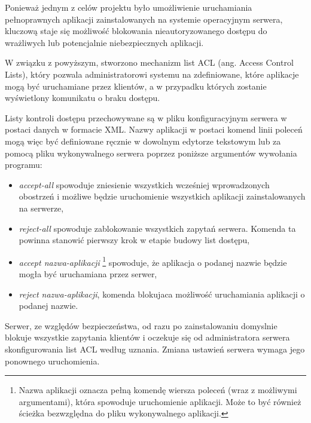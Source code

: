 Ponieważ jednym z celów projektu było umożliwienie uruchamiania pełnoprawnych aplikacji zainstalowanych na systemie operacyjnym serwera, kluczową staje się możliwość blokowania nieautoryzowanego dostępu do wrażliwych lub potencjalnie niebezpiecznych aplikacji.

W związku z powyższym, stworzono mechanizm list ACL (ang. Access Control Lists), który pozwala administratorowi systemu na zdefiniowane, które aplikacje mogą być uruchamiane przez klientów, a w przypadku których zostanie wyświetlony komunikatu o braku dostępu.

Listy kontroli dostępu przechowywane są w pliku konfiguracyjnym serwera w postaci danych w formacie XML. Nazwy aplikacji w postaci komend linii poleceń mogą więc być definiowane ręcznie w dowolnym edytorze tekstowym lub za pomocą pliku wykonywalnego serwera poprzez poniższe argumentów wywołania programu:

\begin{itemize}
\item \emph{accept-all}
spowoduje zniesienie wszystkich wcześniej wprowadzonych obostrzeń i możliwe będzie uruchomienie wszystkich aplikacji zainstalowanych na serwerze,
\item \emph{reject-all}
spowoduje zablokowanie wszystkich zapytań serwera. Komenda ta powinna stanowić pierwszy krok w etapie budowy list dostępu,
\item \emph{accept nazwa-aplikacji} \footnote{Nazwa aplikacji oznacza pełną komendę wiersza poleceń (wraz z możliwymi argumentami), która spowoduje uruchomienie aplikacji. Może to być również ścieżka bezwzględna do pliku wykonywalnego aplikacji.}
spowoduje, że aplikacja o podanej nazwie będzie mogła być uruchamiana przez serwer,
\item \emph{reject nazwa-aplikacji},
komenda blokujaca możliwość uruchamiania aplikacji o podanej nazwie.
\end{itemize}

Serwer, ze względów bezpieczeństwa, od razu po zainstalowaniu domyslnie blokuje wszystkie zapytania klientów i oczekuje się od administratora serwera skonfigurowania list ACL według uznania. Zmiana ustawień serwera wymaga jego ponownego uruchomienia.